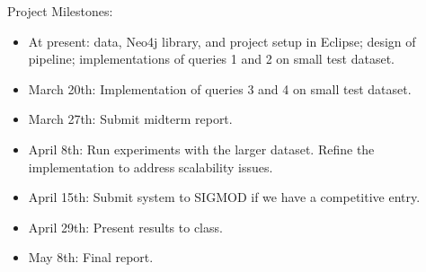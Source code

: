 \documentclass{article}
\begin{document}
Project Milestones:
\begin{itemize}
\item At present: data, Neo4j library, and project setup in Eclipse;
  design of pipeline; implementations of queries 1 and 2 on small test dataset.
\item March 20th: Implementation of queries 3 and 4 on small test dataset.
\item March 27th: Submit midterm report.
\item April 8th:  Run experiments with the larger dataset. Refine the implementation to address scalability issues.
\item April 15th: Submit system to SIGMOD if we have a competitive entry.
\item April 29th: Present results to class.
\item May 8th: Final report.
\end{itemize}



\end{document}
